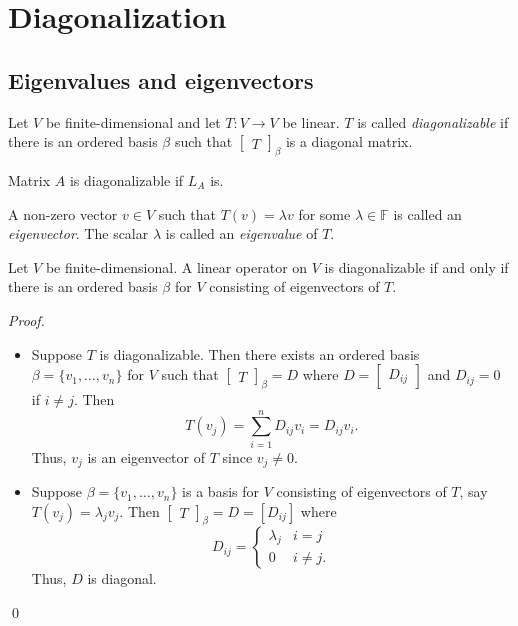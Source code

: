 \documentclass[12pt]{article}
\newenvironment{theorem}[2][Theorem]{\begin{trivlist}
\item[\hskip \labelsep {\bfseries #1}\hskip \labelsep {\bfseries #2.}]}{\end{trivlist}}
\newenvironment{definition}[2][Definition]{\begin{trivlist}
\item[\hskip \labelsep {\bfseries #1}\hskip \labelsep {\bfseries #2}]}{\end{trivlist}}
\newenvironment{sol}
    {\emph{Proof.}
    }
    {
    \qed
    }
\begin{document}
\section{Diagonalization}

\subsection{Eigenvalues and eigenvectors}

\begin{definition}{1}
Let $V$ be finite-dimensional and let $T : V \to V$ be linear. $T$ is called \textit{diagonalizable} if there is an ordered basis $\beta$ such that $\begin{bmatrix} T \end{bmatrix}_\beta$ is a diagonal matrix.
\end{definition}

\noindent Matrix $A$ is diagonalizable if $L_A$ is.

\begin{definition}{2}
A non-zero vector $v \in V$ such that $T(v) = \lambda v$ for some $\lambda \in \mathbb{F}$ is called an \textit{eigenvector}. The scalar $\lambda$ is called an \textit{eigenvalue} of $T$.
\end{definition}

\begin{theorem}{5.1}
Let $V$ be finite-dimensional. A linear operator on $V$ is diagonalizable if and only if there is an ordered basis $\beta$ for $V$ consisting of eigenvectors of $T$.
\end{theorem}

\begin{sol}
\begin{itemize}
    \item[$\Longrightarrow$] Suppose $T$ is diagonalizable. Then there exists an ordered basis $\beta = \{v_1, \dots, v_n\}$ for $V$ such that $\begin{bmatrix}
T
\end{bmatrix}_\beta = D$ where $D = \begin{bmatrix}
D_{ij}
\end{bmatrix}$ and $D_{ij} = 0$ if $i \neq j$. Then $$T(v_j) = \sum_{i = 1}^nD_{ij}v_i = D_{ij}v_i.$$ Thus, $v_j$ is an eigenvector of $T$ since $v_j \neq 0$. 
\item[$\Longleftarrow$] Suppose $\beta = \{v_1, \dots, v_n\}$ is a basis for $V$ consisting of eigenvectors of $T$, say $T(v_j) = \lambda_j v_j$. Then $\begin{bmatrix}
T
\end{bmatrix}_\beta = D = [D_{ij}]$ where $$D_{ij} =
        \begin{cases} 
            \lambda_j & i = j \\
            0 & i \neq j.
        \end{cases}$$ Thus, $D$ is diagonal.
\end{itemize}
\end{sol}
\end{document}
